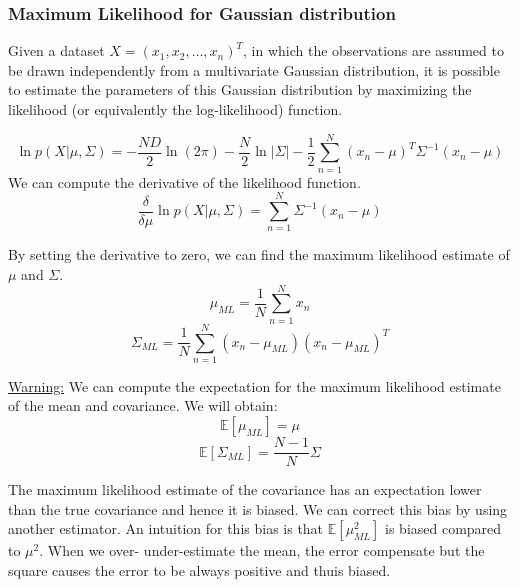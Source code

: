 \subsubsection{Maximum Likelihood for Gaussian distribution}
Given a dataset $X = (x_1, x_2, \dots, x_n)^T$, in which the observations are assumed to be drawn independently from a multivariate Gaussian distribution, it is possible to estimate the parameters of this Gaussian distribution by maximizing the likelihood (or equivalently the log-likelihood) function.

\begin{equation}
    \ln{p(X|\mu, \Sigma)} = -\frac{ND}{2}\ln{(2\pi)}-\frac{N}{2}\ln{|\Sigma|}-\frac{1}{2}\sum_{n=1}^{N} (x_n - \mu)^T \Sigma^{-1} (x_n - \mu)
\end{equation}
We can compute the derivative of the likelihood function.
\begin{equation}
    \frac{\delta}{\delta \mu} \ln{p(X|\mu, \Sigma)} = \sum_{n=1}^{N} \Sigma^{-1} (x_n - \mu)
\end{equation}

By setting the derivative to zero, we can find the maximum likelihood estimate of $\mu$ and $\Sigma$.
\begin{equation}
    \mu_ {ML} = \frac{1}{N}\sum_{n=1}^{N} x_n
\end{equation}
\begin{equation}
    \Sigma_{ML} = \frac{1}{N} \sum_{n=1}^{N} (x_n - \mu_{ML})(x_n - \mu_{ML})^T
\end{equation}

\underline{Warning:} We can compute the expectation for the maximum likelihood estimate of the mean and covariance. We will obtain:
\begin{equation}
    \mathbb{E}[\mu_ {ML}] = \mu
\end{equation}
\begin{equation}
    \mathbb{E}[\Sigma_{ML}] = \frac{N-1}{N}\Sigma
\end{equation}

The maximum likelihood estimate of the covariance has an expectation lower than the true covariance and hence it is biased. We can correct this bias by using another estimator.
An intuition for this bias is that $\mathbb{E}[\mu_{ML}^2]$ is biased compared to $\mu^2$. When we over- under-estimate the mean, the error compensate but the square causes the error to be always positive and thuis biased.


